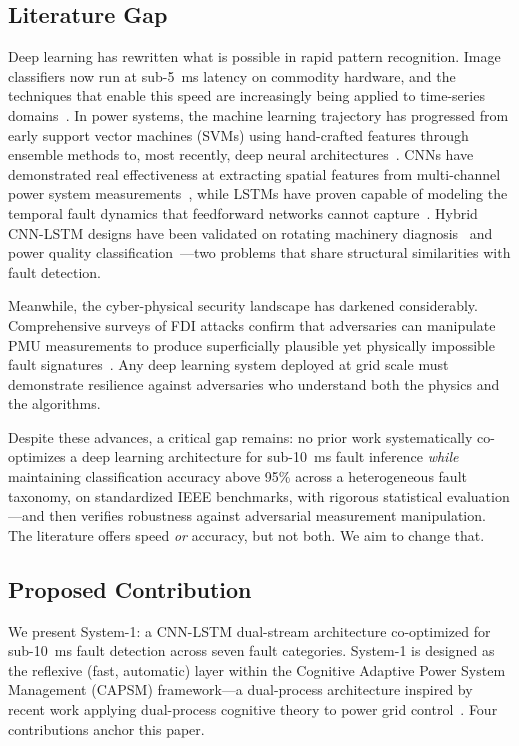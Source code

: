 \documentclass[journal]{IEEEtran}
\begin{document}
\subsection{Literature Gap}

Deep learning has rewritten what is possible in rapid pattern recognition. Image classifiers now run at sub-5~ms latency on commodity hardware, and the techniques that enable this speed are increasingly being applied to time-series domains~\cite{ref6}. In power systems, the machine learning trajectory has progressed from early support vector machines (SVMs) using hand-crafted features through ensemble methods to, most recently, deep neural architectures~\cite{ref7,ref8}. CNNs have demonstrated real effectiveness at extracting spatial features from multi-channel power system measurements~\cite{ref9}, while LSTMs have proven capable of modeling the temporal fault dynamics that feedforward networks cannot capture~\cite{ref10}. Hybrid CNN-LSTM designs have been validated on rotating machinery diagnosis~\cite{ref11} and power quality classification~\cite{ref12}---two problems that share structural similarities with fault detection.

Meanwhile, the cyber-physical security landscape has darkened considerably. Comprehensive surveys of FDI attacks confirm that adversaries can manipulate PMU measurements to produce superficially plausible yet physically impossible fault signatures~\cite{ref13,ref14}. Any deep learning system deployed at grid scale must demonstrate resilience against adversaries who understand both the physics and the algorithms.

Despite these advances, a critical gap remains: no prior work systematically co-optimizes a deep learning architecture for sub-10~ms fault inference \emph{while} maintaining classification accuracy above 95\% across a heterogeneous fault taxonomy, on standardized IEEE benchmarks, with rigorous statistical evaluation---and then verifies robustness against adversarial measurement manipulation. The literature offers speed \emph{or} accuracy, but not both. We aim to change that.

\subsection{Proposed Contribution}

We present System-1: a CNN-LSTM dual-stream architecture co-optimized for sub-10~ms fault detection across seven fault categories. System-1 is designed as the reflexive (fast, automatic) layer within the Cognitive Adaptive Power System Management (CAPSM) framework---a dual-process architecture inspired by recent work applying dual-process cognitive theory to power grid control~\cite{ref15}. Four contributions anchor this paper.
\end{document}
